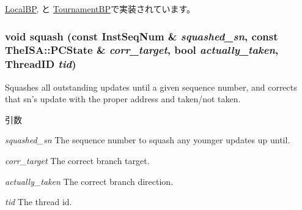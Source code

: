 \hyperlink{classLocalBP_aeb215cee5cdccdf52d02b73fffe80220}{LocalBP}, と \hyperlink{classTournamentBP_aeb215cee5cdccdf52d02b73fffe80220}{TournamentBP}で実装されています。\hypertarget{classBPredUnit_af5d7fa639b2e7ef3c6449d26f93771a0}{
\subsubsection[{squash}]{\setlength{\rightskip}{0pt plus 5cm}void squash (const {\bf InstSeqNum} \& {\em squashed\_\-sn}, \/  const TheISA::PCState \& {\em corr\_\-target}, \/  bool {\em actually\_\-taken}, \/  {\bf ThreadID} {\em tid})}}
\label{classBPredUnit_af5d7fa639b2e7ef3c6449d26f93771a0}
Squashes all outstanding updates until a given sequence number, and corrects that sn's update with the proper address and taken/not taken. 
\begin{DoxyParams}{引数}
\item[{\em squashed\_\-sn}]The sequence number to squash any younger updates up until. \item[{\em corr\_\-target}]The correct branch target. \item[{\em actually\_\-taken}]The correct branch direction. \item[{\em tid}]The thread id. \end{DoxyParams}



